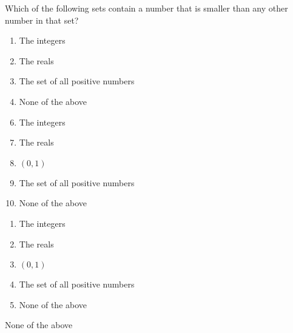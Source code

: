 


   Which of the following sets contain a number that is smaller than any other number in that set?


\ifsat
	\begin{enumerate}[label=\Alph*)]
		\item   The integers
		\item  The reals
		\item  The set of all positive numbers
		\item  None of the above %
	\end{enumerate}
\else
\fi

\ifacteven
	\begin{enumerate}[label=\textbf{\Alph*.},itemsep=\fill,align=left]
		\setcounter{enumii}{5}
		\item   The integers
		\item  The reals
		\item  $(0,1)$
		\addtocounter{enumii}{1}
		\item  The set of all positive numbers
		\item  None of the above %
	\end{enumerate}
\else
\fi

\ifactodd
	\begin{enumerate}[label=\textbf{\Alph*.},itemsep=\fill,align=left]
		\item   The integers
		\item  The reals
		\item  $(0,1)$
		\item  The set of all positive numbers
		\item  None of the above %
	\end{enumerate}
\else
\fi

\ifgridin
  None of the above %

\else
\fi

